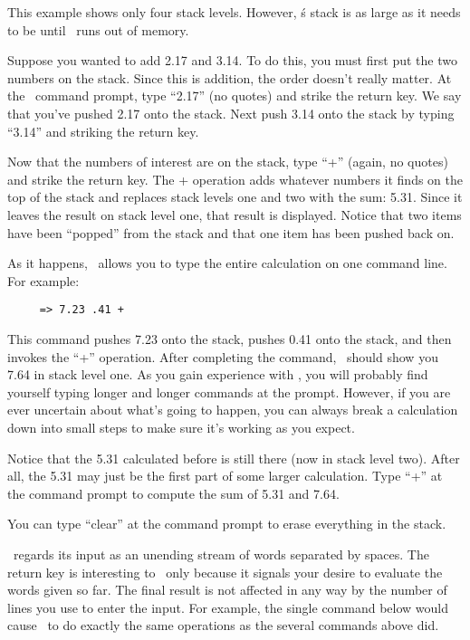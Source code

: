 This example shows only four stack levels. However, \CLAC\'s stack is as large as it needs to be
until \CLAC\ runs out of memory.

Suppose you wanted to add 2.17 and 3.14. To do this, you must first put the two numbers on the
stack. Since this is addition, the order doesn't really matter. At the \CLAC\ command prompt,
type ``2.17'' (no quotes) and strike the return key. We say that you've pushed 2.17 onto the
stack. Next push 3.14 onto the stack by typing ``3.14'' and striking the return key.

Now that the numbers of interest are on the stack, type ``+'' (again, no quotes) and strike the
return key. The + operation adds whatever numbers it finds on the top of the stack and replaces
stack levels one and two with the sum: 5.31. Since it leaves the result on stack level one, that
result is displayed. Notice that two items have been ``popped'' from the stack and that one item
has been pushed back on.

As it happens, \CLAC\ allows you to type the entire calculation on one command line. For
example:

\begin{verbatim}
     => 7.23 .41 +
\end{verbatim}

This command pushes 7.23 onto the stack, pushes 0.41 onto the stack, and then invokes the ``+''
operation. After completing the command, \CLAC\ should show you 7.64 in stack level one. As you
gain experience with \CLAC, you will probably find yourself typing longer and longer commands at
the prompt. However, if you are ever uncertain about what's going to happen, you can always
break a calculation down into small steps to make sure it's working as you expect.

Notice that the 5.31 calculated before is still there (now in stack level two). After all, the
5.31 may just be the first part of some larger calculation. Type ``+'' at the command prompt to
compute the sum of 5.31 and 7.64.

You can type ``clear'' at the command prompt to erase everything in the stack.

\CLAC\ regards its input as an unending stream of words separated by spaces. The return key is
interesting to \CLAC\ only because it signals your desire to evaluate the words given so far.
The final result is not affected in any way by the number of lines you use to enter the input.
For example, the single command below would cause \CLAC\ to do exactly the same operations as
the several commands above did.


